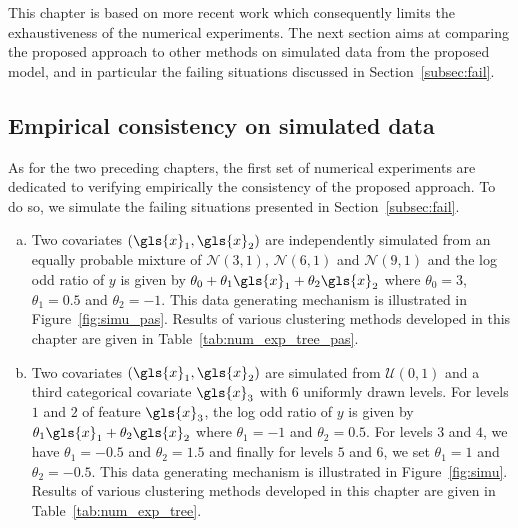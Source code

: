 This chapter is based on more recent work which consequently limits the exhaustiveness of the numerical experiments. The next section aims at comparing the proposed approach to other methods on simulated data from the proposed model, and in particular the failing situations discussed in Section~\ref{subsec:fail}.

\subsection{Empirical consistency on simulated data} \label{subsec:num_sim}

As for the two preceding chapters, the first set of numerical experiments are dedicated to verifying empirically the consistency of the proposed approach. To do so, we simulate the failing situations presented in Section~\ref{subsec:fail}.

\begin{enumerate}[(a)]
\item Two covariates $(\gls{x}_1,\gls{x}_2)$ are independently simulated from an equally probable mixture of $\mathcal{N}(3,1)$, $\mathcal{N}(6,1)$ and $\mathcal{N}(9,1)$ and the log odd ratio of $y$ is given by $\theta_0 + \theta_1 \gls{x}_1 + \theta_2 \gls{x}_2$ where $\theta_0 = 3$, $\theta_1 = 0.5$ and $\theta_2 = -1$. This data generating mechanism is illustrated in Figure~\ref{fig:simu_pas}. Results of various clustering methods developed in this chapter are given in Table~\ref{tab:num_exp_tree_pas}.
\item Two covariates $(\gls{x}_1,\gls{x}_2)$ are simulated from $\mathcal{U}(0,1)$ and a third categorical covariate $\gls{x}_3$ with 6 uniformly drawn levels. For levels $1$ and $2$ of feature $\gls{x}_3$, the log odd ratio of $y$ is given by $\theta_1 \gls{x}_1 + \theta_2 \gls{x}_2$ where $\theta_1 = -1$ and $\theta_2 = 0.5$. For levels $3$ and $4$, we have $\theta_1 = -0.5$ and $\theta_2 = 1.5$ and finally for levels $5$ and $6$, we set $\theta_1 = 1$ and $\theta_2 = -0.5$. This data generating mechanism is illustrated in Figure~\ref{fig:simu}. Results of various clustering methods developed in this chapter are given in Table~\ref{tab:num_exp_tree}.
\end{enumerate}

